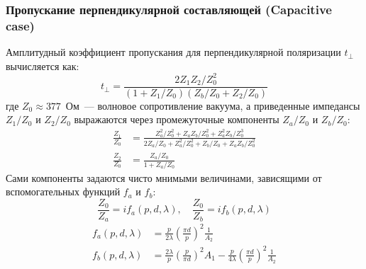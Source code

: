 \subsubsection{Пропускание перпендикулярной составляющей (Capacitive case)}
Амплитудный коэффициент пропускания для перпендикулярной поляризации $t_\perp$ вычисляется как:
\begin{equation}
    t_\perp = \frac{2 Z_1 Z_2 / Z_0^2}{(1 + Z_1/Z_0)(Z_b/Z_0 + Z_2/Z_0)} \label{eq:t_perp}
\end{equation}
где $Z_0 \approx 377$~Ом~--- волновое сопротивление вакуума, а приведенные импедансы $Z_1/Z_0$ и $Z_2/Z_0$ выражаются через промежуточные компоненты $Z_a/Z_0$ и $Z_b/Z_0$:
\begin{align}
    \frac{Z_1}{Z_0} &= \frac{Z_a^2/Z_0^2 + Z_a Z_b / Z_0^2 + Z_a^2 Z_b / Z_0^3}{2 Z_a/Z_0 + Z_a^2/Z_0^2 + Z_b/Z_0 + Z_a Z_b / Z_0^2} \\
    \frac{Z_2}{Z_0} &= \frac{Z_a/Z_0}{1 + Z_a/Z_0}
\end{align}
Сами компоненты задаются чисто мнимыми величинами, зависящими от вспомогательных функций $f_a$ и $f_b$:
\begin{equation}
    \frac{Z_0}{Z_a} = i f_a\left(p, d, \lambda\right), \quad \frac{Z_0}{Z_b} = i f_b\left(p, d, \lambda\right)
\end{equation}
\begin{align}
    f_a(p, d, \lambda) &= \frac{p}{2\lambda} \left(\frac{\pi d}{p}\right)^2 \frac{1}{A_2} \label{eq:fa} \\
    f_b(p, d, \lambda) &= \frac{2\lambda}{p} \left(\frac{p}{\pi d}\right)^2 A_1 - \frac{p}{4\lambda} \left(\frac{\pi d}{p}\right)^2 \frac{1}{A_2} \label{eq:fb}
\end{align}

